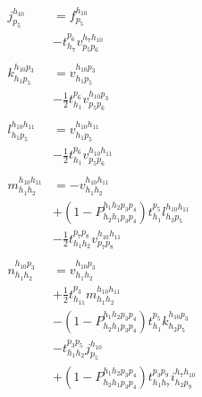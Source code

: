 \documentclass{article}
\begin{document}
\begin{align}
j ^{ h_{10} } _{ p_{5} }              &= f ^{ h_{10} } _{ p_{5} }\tag{ccsd\_t2\_2\_4\_1}\\
                                      &- t ^{ p_{6} } _{ h_{7} } v ^{ h_{7} h_{10} } _{ p_{5} p_{6} }\tag{ccsd\_t2\_2\_4\_2}\\
\nonumber\\
k ^{ h_{10} p_{3} } _{ h_{1} p_{5} }  &= v ^{ h_{10} p_{3} } _{ h_{1} p_{5} }\tag{ccsd\_t2\_2\_3\_1}\\
                                      &- \frac{1}{2} t ^{ p_{6} } _{ h_{1} } v ^{ h_{10} p_{3} } _{ p_{5} p_{6} }\tag{ccsd\_t2\_2\_3\_2}\\
\nonumber\\
l ^{ h_{10} h_{11} } _{ h_{1} p_{5} } &= v ^{ h_{10} h_{11} } _{ h_{1} p_{5} }\tag{ccsd\_t2\_2\_2\_2\_1}\\
                                      &- \frac{1}{2} t ^{ p_{6} } _{ h_{1} } v ^{ h_{10} h_{11} } _{ p_{5} p_{6} }\tag{ccsd\_t2\_2\_2\_2\_2}\\
\nonumber\\
m ^{ h_{10} h_{11} } _{ h_{1} h_{2} } &= -v ^{ h_{10} h_{11} } _{ h_{1} h_{2} }\tag{ccsd\_t2\_2\_2\_1}\\
                                      &+ \left(1- P^{ h_{1} h_{2} p_{3} p_{4}}_{ h_{2} h_{1} p_{3} p_{4}} \right) t ^{ p_{5} } _{ h_{1} } l ^{ h_{10} h_{11} } _{ h_{2} p_{5} }\tag{ccsd\_t2\_2\_2\_2}\\
                                      &- \frac{1}{2} t ^{ p_{7} p_{8} } _{ h_{1} h_{2} } v ^{ h_{10} h_{11} } _{ p_{7} p_{8} }\tag{ccsd\_t2\_2\_2\_3}\\
\nonumber\\
n ^{ h_{10} p_{3} } _{ h_{1} h_{2} }  &= v ^{ h_{10} p_{3} } _{ h_{1} h_{2} }\tag{ccsd\_t2\_2\_1}\\
                                      &+ \frac{1}{2} t ^{ p_{3} } _{ h_{11} } m ^{ h_{10} h_{11} } _{ h_{1} h_{2} }\tag{ccsd\_t2\_2\_2}\\
                                      &- \left(1- P^{ h_{1} h_{2} p_{3} p_{4}}_{ h_{2} h_{1} p_{3} p_{4}} \right) t ^{ p_{5} } _{ h_{1} } k ^{ h_{10} p_{3} } _{ h_{2} p_{5} }\tag{ccsd\_t2\_2\_3}\\
                                      &- t ^{ p_{3} p_{5} } _{ h_{1} h_{2} } j ^{ h_{10} } _{ p_{5} }\tag{ccsd\_t2\_2\_4}\\
                                      &+ \left(1- P^{ h_{1} h_{2} p_{3} p_{4}}_{ h_{2} h_{1} p_{3} p_{4}} \right) t ^{ p_{3} p_{9} } _{ h_{1} h_{7} } i ^{ h_{7} h_{10} } _{ h_{2} p_{9} }\tag{ccsd\_t2\_2\_5}\\

\end{align}
\end{document}

